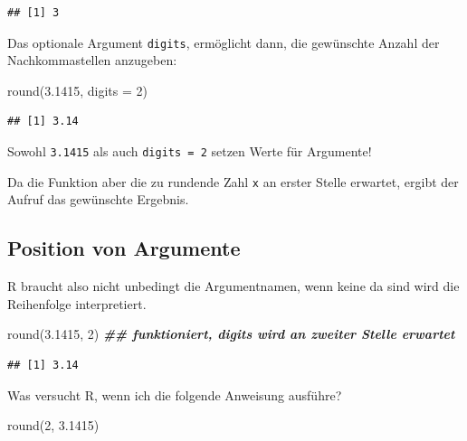 \documentclass[
]{book}
\newenvironment{Shaded}{\begin{snugshade}}{\end{snugshade}}
\newcommand{\AttributeTok}[1]{\textcolor[rgb]{0.77,0.63,0.00}{#1}}
\newcommand{\DecValTok}[1]{\textcolor[rgb]{0.00,0.00,0.81}{#1}}
\newcommand{\DocumentationTok}[1]{\textcolor[rgb]{0.56,0.35,0.01}{\textbf{\textit{#1}}}}
\newcommand{\FloatTok}[1]{\textcolor[rgb]{0.00,0.00,0.81}{#1}}
\newcommand{\FunctionTok}[1]{\textcolor[rgb]{0.00,0.00,0.00}{#1}}
\newcommand{\NormalTok}[1]{#1}
\begin{document}
\begin{verbatim}
## [1] 3
\end{verbatim}

Das optionale Argument \texttt{digits}, ermöglicht dann, die gewünschte Anzahl der Nachkommastellen anzugeben:

\begin{Shaded}
\begin{Highlighting}[]
\FunctionTok{round}\NormalTok{(}\FloatTok{3.1415}\NormalTok{, }\AttributeTok{digits =} \DecValTok{2}\NormalTok{)}
\end{Highlighting}
\end{Shaded}

\begin{verbatim}
## [1] 3.14
\end{verbatim}

Sowohl \texttt{3.1415} als auch \texttt{digits\ =\ 2} setzen Werte für Argumente!

Da die Funktion aber die zu rundende Zahl \texttt{x} an erster Stelle erwartet, ergibt der Aufruf das gewünschte Ergebnis.

\hypertarget{position-von-argumente}{%
\subsection{Position von Argumente}\label{position-von-argumente}}

R braucht also nicht unbedingt die Argumentnamen, wenn keine da sind wird die Reihenfolge interpretiert.

\begin{Shaded}
\begin{Highlighting}[]
\FunctionTok{round}\NormalTok{(}\FloatTok{3.1415}\NormalTok{, }\DecValTok{2}\NormalTok{) }\DocumentationTok{\#\# funktioniert, digits wird an zweiter Stelle erwartet}
\end{Highlighting}
\end{Shaded}

\begin{verbatim}
## [1] 3.14
\end{verbatim}

Was versucht R, wenn ich die folgende Anweisung ausführe?

\begin{Shaded}
\begin{Highlighting}[]
\FunctionTok{round}\NormalTok{(}\DecValTok{2}\NormalTok{, }\FloatTok{3.1415}\NormalTok{)}
\end{Highlighting}
\end{Shaded}
\end{document}
